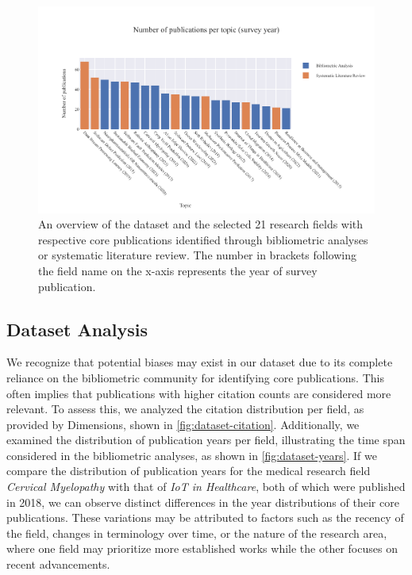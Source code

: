 \begin{figure}
	\centering	
	\includegraphics[scale=0.75]{pics/dataset-overview.pdf}
	\caption[Dataset Overview of the Research Fields]{An overview of the dataset and the selected 21 research fields with respective core publications identified through bibliometric analyses or systematic literature review. The number in brackets following the field name on the x-axis represents the year of survey publication.}
	\label{fig:dataset-overview}
\end{figure}


\subsection{Dataset Analysis}

We recognize that potential biases may exist in our dataset due to its complete reliance on the bibliometric community for identifying core publications. This often implies that publications with higher citation counts are considered more relevant. To assess this, we analyzed the citation distribution per field, as provided by Dimensions, shown in \autoref{fig:dataset-citation}. Additionally, we examined the distribution of publication years per field, illustrating the time span considered in the bibliometric analyses, as shown in \autoref{fig:dataset-years}.  If we compare the distribution of publication years for the medical research field \textit{Cervical Myelopathy} with that of \textit{IoT in Healthcare}, both of which were published in 2018, we can observe distinct differences in the year distributions of their core publications. These variations may be attributed to factors such as the recency of the field, changes in terminology over time, or the nature of the research area, where one field may prioritize more established works while the other focuses on recent advancements.


